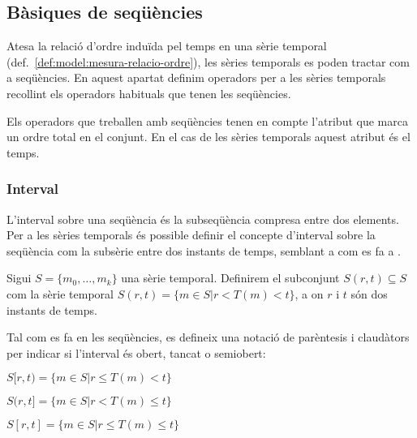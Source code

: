 \subsection{Bàsiques de seqüències}

Atesa la relació d'ordre induïda pel temps en una sèrie temporal
(def.\ \ref{def:model:mesura-relacio-ordre}), les sèries temporals es
poden tractar com a seqüències.  En aquest apartat definim operadors
per a les sèries temporals recollint els operadors habituals que tenen
les seqüències.

Els operadors que treballen amb seqüències tenen en compte l'atribut
que marca un ordre total en el conjunt. En el cas de les sèries
temporals aquest atribut és el temps.



\subsubsection{Interval}

L'interval sobre una seqüència és la subseqüència compresa entre dos
elements.  Per a les sèries temporals és possible definir el concepte
d'interval sobre la seqüència com la subsèrie entre dos instants de
temps, semblant a com es fa a \cite{last:keogh,last:hetland}.

\begin{definition}[Interval]
  \label{def:model:st-interval}
  Sigui $S=\{m_0, \ldots, m_k\}$ una sèrie temporal. Definirem el subconjunt
  $S(r,t) \subseteq S$ com la sèrie temporal $S(r,t)=\{m\in S
  | r<T(m)<t\}$, a on $r$ i $t$ són dos instants de temps.

  Tal com es fa en les seqüències, es defineix una notació de
  parèntesis i claudàtors per indicar si l'interval és obert, tancat o
  semiobert:

  $S[r,t)=\{m\in S  | r\leq T(m)< t\}$

  $S(r,t]=\{m\in S  | r<T(m)\leq t\}$

  $S[r,t]=\{m\in S  | r\leq T(m)\leq t\}$
\end{definition}


